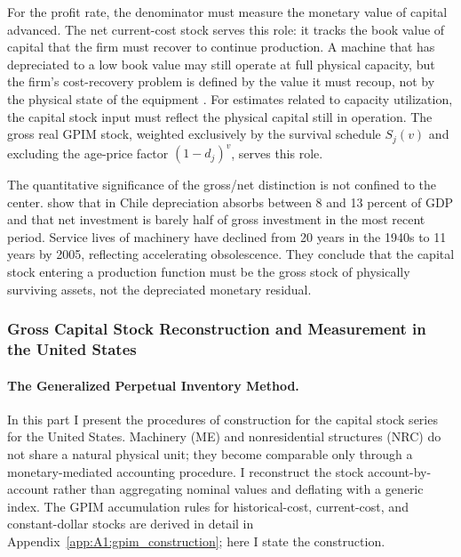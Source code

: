 For the profit rate, the denominator must measure the monetary value
of capital advanced. The net current-cost stock serves this role: it
tracks the book value of capital that the firm must recover to
continue production. A machine that has depreciated to a low book
value may still operate at full physical capacity, but the firm's
cost-recovery problem is defined by the value it must recoup, not by
the physical state of the equipment \citep{Basu2013}. For estimates
related to capacity utilization, the capital stock input must reflect
the physical capital still in operation. The gross real GPIM stock,
weighted exclusively by the survival schedule $S_j(v)$ and excluding
the age-price factor $(1-d_j)^v$, serves this role.

The quantitative significance of the gross/net distinction is not
confined to the center. \citet{Ffrench2016} show that in Chile
depreciation absorbs between 8 and 13 percent of GDP and that net
investment is barely half of gross investment in the most recent
period. Service lives of machinery have declined from 20 years in
the 1940s to 11 years by 2005, reflecting accelerating obsolescence.
They conclude that the capital stock entering a production function
must be the gross stock of physically surviving assets, not the
depreciated monetary residual.

\subsubsection{Gross Capital Stock Reconstruction and Measurement in the United States}
\label{sec:412:us_capital}

\paragraph{The Generalized Perpetual Inventory Method.}
In this part I present the procedures of construction for 
the capital stock series for the United States. Machinery (ME) and nonresidential structures (NRC) do not
share a natural physical unit; they become comparable only through a
monetary-mediated accounting procedure. I reconstruct the stock
account-by-account rather than aggregating nominal values and
deflating with a generic index. The GPIM accumulation rules for
historical-cost, current-cost, and constant-dollar stocks
\citep[App.~6.5]{Shaikh2016} are derived in detail in
Appendix~\ref{app:A1:gpim_construction}; here I state the construction.

